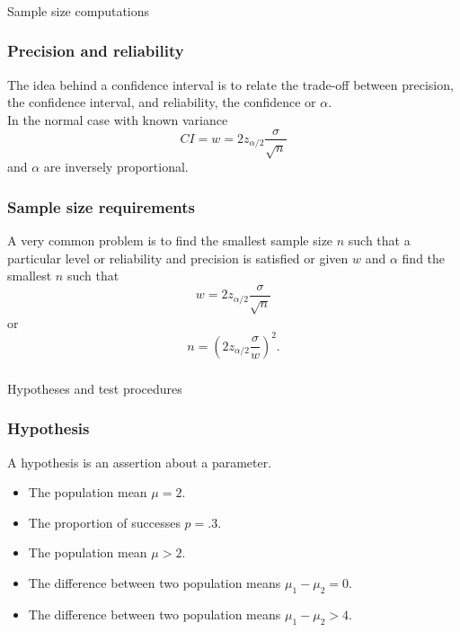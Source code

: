 \begin{frame}[fragile]\frametitle{}
\begin{center}
{\Large Sample size computations}

\end{center}
\end{frame}



\begin{frame}[fragile]\frametitle{Precision and reliability}

The idea behind a confidence interval is to relate
the trade-off between precision, the confidence interval,
and reliability, the confidence or $\alpha$. \\ 
In the normal case with known variance
$$CI = w = 2 z_{\alpha/2} \frac{\sigma}{\sqrt{n}}$$
and $\alpha$ are inversely proportional. \\ 

\end{frame}

\begin{frame}[fragile]\frametitle{Sample size requirements}

A very common problem is to find the smallest
sample size $n$ such that a particular level
or reliability and precision is satisfied or
given $w$ and $\alpha$ find the smallest $n$ such
that
$$w = 2 z_{\alpha/2} \frac{\sigma}{\sqrt{n}}$$
or
$$n = \left(2 z_{\alpha/2} \frac{\sigma}{w}\right)^2.$$

\end{frame}


\begin{frame}[fragile]\frametitle{}
\begin{center}
{\Large Hypotheses and test procedures}

\end{center}
\end{frame}




\begin{frame}[fragile]\frametitle{Hypothesis}

A hypothesis is an assertion about a parameter.

\begin{itemize}

\item The population mean $\mu = 2$.
\item The proportion of successes $p = .3$.
\item The population mean $\mu > 2$.
\item The difference between two population means $\mu_1 - \mu_2 = 0$.
\item The difference between two population means $\mu_1 - \mu_2 > 4$.

\end{itemize}

\end{frame}


